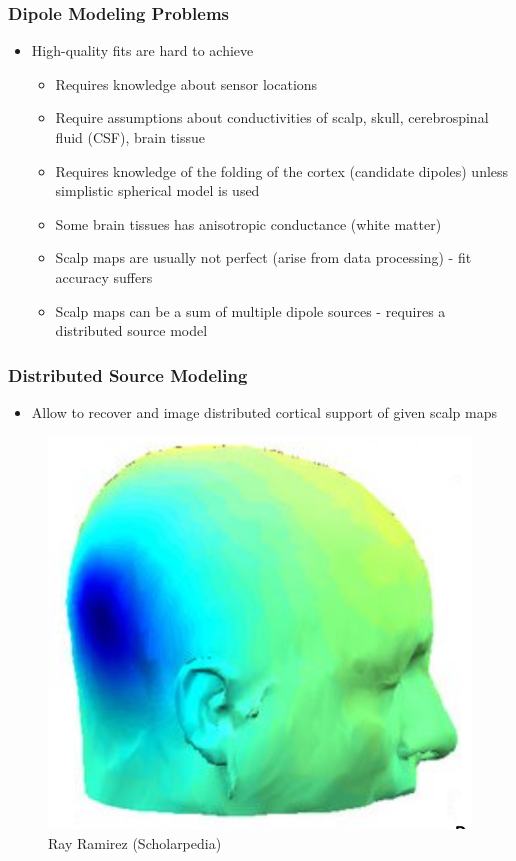 \documentclass{beamer}
\begin{document}
\begin{frame}
\frametitle{Dipole Modeling Problems}
\begin{itemize}
	\item High-quality fits are hard to achieve
	\begin{itemize}
		\item Requires knowledge about sensor locations
		\item Require assumptions about conductivities of scalp, skull, cerebrospinal fluid (CSF), brain tissue
		\item Requires knowledge of the folding of the cortex (candidate dipoles) unless simplistic spherical model is used
		\item Some brain tissues has anisotropic conductance (white matter)
		\item Scalp maps are usually not perfect (arise from data processing) - fit accuracy suffers
		\item Scalp maps can be a sum of multiple dipole sources - requires a distributed source model
	\end{itemize}
\end{itemize}
\end{frame}

\begin{frame}
\frametitle{Distributed Source Modeling}
\begin{itemize}
	\item Allow to recover and image distributed cortical support of given scalp maps
\end{itemize}
	\begin{figure}
		\includegraphics[width=0.5\linewidth]{image/dsm}
		\caption{Ray Ramirez (Scholarpedia)}
	\end{figure}
\end{frame}
\end{document}
